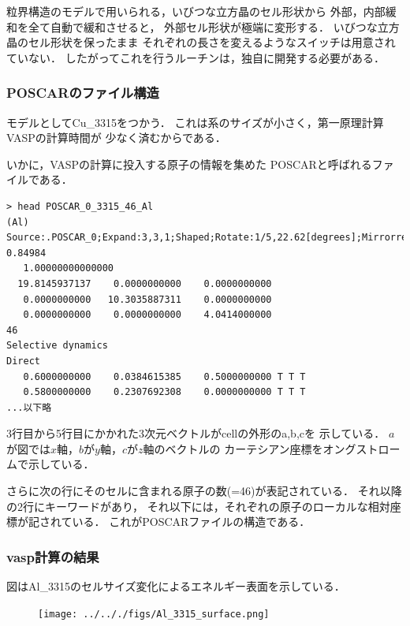 \documentclass[11pt,dvipdfmx]{jsarticle}
\begin{document}
\label{fig:}
粒界構造のモデルで用いられる，いびつな立方晶のセル形状から
外部，内部緩和を全て自動で緩和させると， 外部セル形状が極端に変形する．
いびつな立方晶のセル形状を保ったまま
それぞれの長さを変えるようなスイッチは用意されていない．
したがってこれを行うルーチンは，独自に開発する必要がある．

    \subsubsection{POSCARのファイル構造}\label{poscarux306eux30d5ux30a1ux30a4ux30ebux69cbux9020}

モデルとしてCu\_3315をつかう．
これは系のサイズが小さく，第一原理計算VASPの計算時間が
少なく済むからである．

いかに，VASPの計算に投入する原子の情報を集めた
POSCARと呼ばれるファイルである．

\begin{verbatim}
> head POSCAR_0_3315_46_Al
(Al) Source:.POSCAR_0;Expand:3,3,1;Shaped;Rotate:1/5,22.62[degrees];Mirrorred;Shaped2;Cut:0.81715-0.84984
   1.00000000000000
  19.8145937137    0.0000000000    0.0000000000
   0.0000000000   10.3035887311    0.0000000000
   0.0000000000    0.0000000000    4.0414000000
46
Selective dynamics
Direct
   0.6000000000    0.0384615385    0.5000000000 T T T
   0.5800000000    0.2307692308    0.0000000000 T T T
...以下略
\end{verbatim}

3行目から5行目にかかれた3次元ベクトルがcellの外形のa,b,cを 示している．
\(a\)が図では\(x\)軸，\(b\)が\(y\)軸，\(c\)が\(z\)軸のベクトルの
カーテシアン座標をオングストロームで示している．

さらに次の行にそのセルに含まれる原子の数(=46)が表記されている．
それ以降の2行にキーワードがあり，
それ以下には，それぞれの原子のローカルな相対座標が記されている．
これがPOSCARファイルの構造である．

    \subsubsection{vasp計算の結果}\label{vaspux8a08ux7b97ux306eux7d50ux679c}

    図はAl\_3315のセルサイズ変化によるエネルギー表面を示している．

\begin{figure}[H][htbp]
\centering
\begin{center}
\texttt{[image: ../.././figs/Al\_3315\_surface.png]}
\end{center}
\caption{}

\label{fig:}
\end{figure}
\end{document}
